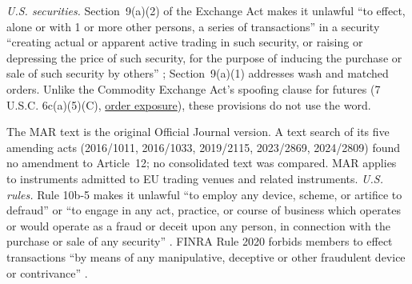 \begin{qfrule}
\emph{U.S. securities.} Section~9(a)(2) of the Exchange Act makes it unlawful ``to effect, alone or with 1 or more other persons, a series of transactions'' in a security ``creating actual or apparent active trading in such security, or raising or depressing the price of such security, for the purpose of inducing the purchase or sale of such security by others'' \citep[15 U.S.C. 78i(a)(2), 2023 edition]{usc-15-78i}; Section~9(a)(1) addresses wash and matched orders. Unlike the Commodity Exchange Act's spoofing clause for futures (7 U.S.C. 6c(a)(5)(C), \hyperref[def:order-exposure-decisions]{order exposure}), these provisions do not use the word.

 The MAR text is the original Official Journal version. A text search of its five amending acts (2016/1011, 2016/1033, 2019/2115, 2023/2869, 2024/2809) found no amendment to Article~12; no consolidated text was compared. MAR applies to instruments admitted to EU trading venues and related instruments. \emph{U.S. rules.} Rule 10b-5 makes it unlawful ``to employ any device, scheme, or artifice to defraud'' or ``to engage in any act, practice, or course of business which operates or would operate as a fraud or deceit upon any person, in connection with the purchase or sale of any security'' \citep[17 CFR 240.10b-5(a), (c)]{ecfr-17cfr240-10b-5}. FINRA Rule 2020 forbids members to effect transactions ``by means of any manipulative, deceptive or other fraudulent device or contrivance'' \citep[Rule 2020]{finra-rules-2026}.


\end{qfrule}
